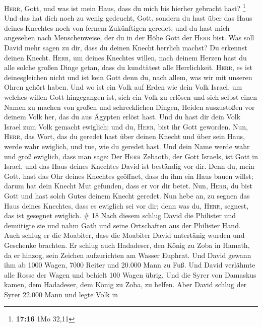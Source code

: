 \textsc{Herr}, Gott, und was ist mein Haus, dass du mich bis hierher
gebracht hast? \footnote{\textbf{17:16} 1Mo 32,11}  Und
das hat dich noch zu wenig gedeucht, Gott, sondern du hast über das Haus
deines Knechtes noch von fernem Zukünftigen geredet; und du hast mich
angesehen nach Menschenweise, der du in der Höhe Gott der \textsc{Herr}
bist.  Was soll David mehr sagen zu dir, dass du deinen
Knecht herrlich machst? Du erkennst deinen Knecht. 
\textsc{Herr}, um deines Knechtes willen, nach deinem Herzen hast du
alle solche großen Dinge getan, dass du kundtätest alle Herrlichkeit.
 \textsc{Herr}, es ist deinesgleichen nicht und ist kein
Gott denn du, nach allem, was wir mit unseren Ohren gehört haben.
 Und wo ist ein Volk auf Erden wie dein Volk Israel, um
welches willen Gott hingegangen ist, sich ein Volk zu erlösen und sich
selbst einen Namen zu machen von großen und schrecklichen Dingen, Heiden
auszustoßen vor deinem Volk her, das du aus Ägypten erlöst hast.
 Und du hast dir dein Volk Israel zum Volk gemacht
ewiglich; und du, \textsc{Herr}, bist ihr Gott geworden. 
Nun, \textsc{Herr}, das Wort, das du geredet hast über deinen Knecht und
über sein Haus, werde wahr ewiglich, und tue, wie du geredet hast.
 Und dein Name werde wahr und groß ewiglich, dass man
sage: Der \textsc{Herr} Zebaoth, der Gott Israels, ist Gott in Israel,
und das Haus deines Knechtes David ist beständig vor dir.
 Denn du, mein Gott, hast das Ohr deines Knechtes
geöffnet, dass du ihm ein Haus bauen willst; darum hat dein Knecht Mut
gefunden, dass er vor dir betet.  Nun, \textsc{Herr}, du
bist Gott und hast solch Gutes deinem Knecht geredet. 
Nun hebe an, zu segnen das Haus deines Knechtes, dass es ewiglich sei
vor dir; denn was du, \textsc{Herr}, segnest, das ist gesegnet ewiglich.
\# 18  Nach diesem schlug David die Philister und
demütigte sie und nahm Gath und seine Ortschaften aus der Philister
Hand.  Auch schlug er die Moabiter, dass die Moabiter
David untertänig wurden und Geschenke brachten.  Er schlug
auch Hadadeser, den König zu Zoba in Hamath, da er hinzog, sein Zeichen
aufzurichten am Wasser Euphrat.  Und David gewann ihm ab
1000 Wagen, 7000 Reiter und 20.000 Mann zu Fuß. Und David verlähmte alle
Rosse der Wagen und behielt 100 Wagen übrig.  Und die
Syrer von Damaskus kamen, dem Hadadeser, dem König zu Zoba, zu helfen.
Aber David schlug der Syrer 22.000 Mann  und legte Volk in
